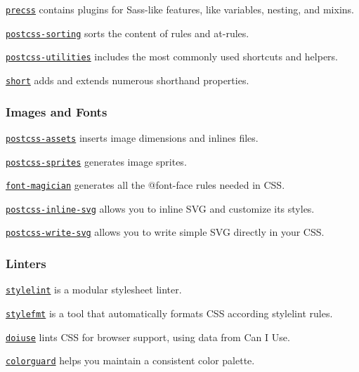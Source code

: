 \begin{DoxyItemize}
\item \href{https://github.com/jonathantneal/precss}{\tt {\ttfamily precss}} contains plugins for Sass-\/like features, like variables, nesting, and mixins.
\item \href{https://github.com/hudochenkov/postcss-sorting}{\tt {\ttfamily postcss-\/sorting}} sorts the content of rules and at-\/rules.
\item \href{https://github.com/ismamz/postcss-utilities}{\tt {\ttfamily postcss-\/utilities}} includes the most commonly used shortcuts and helpers.
\item \href{https://github.com/jonathantneal/postcss-short}{\tt {\ttfamily short}} adds and extends numerous shorthand properties.
\end{DoxyItemize}

\subsubsection*{Images and Fonts}


\begin{DoxyItemize}
\item \href{https://github.com/assetsjs/postcss-assets}{\tt {\ttfamily postcss-\/assets}} inserts image dimensions and inlines files.
\item \href{https://github.com/2createStudio/postcss-sprites}{\tt {\ttfamily postcss-\/sprites}} generates image sprites.
\item \href{https://github.com/jonathantneal/postcss-font-magician}{\tt {\ttfamily font-\/magician}} generates all the {\ttfamily @font-\/face} rules needed in C\+SS.
\item \href{https://github.com/TrySound/postcss-inline-svg}{\tt {\ttfamily postcss-\/inline-\/svg}} allows you to inline S\+VG and customize its styles.
\item \href{https://github.com/jonathantneal/postcss-write-svg}{\tt {\ttfamily postcss-\/write-\/svg}} allows you to write simple S\+VG directly in your C\+SS.
\end{DoxyItemize}

\subsubsection*{Linters}


\begin{DoxyItemize}
\item \href{https://github.com/stylelint/stylelint}{\tt {\ttfamily stylelint}} is a modular stylesheet linter.
\item \href{https://github.com/morishitter/stylefmt}{\tt {\ttfamily stylefmt}} is a tool that automatically formats C\+SS according {\ttfamily stylelint} rules.
\item \href{https://github.com/anandthakker/doiuse}{\tt {\ttfamily doiuse}} lints C\+SS for browser support, using data from Can I Use.
\item \href{https://github.com/SlexAxton/css-colorguard}{\tt {\ttfamily colorguard}} helps you maintain a consistent color palette.
\end{DoxyItemize}

